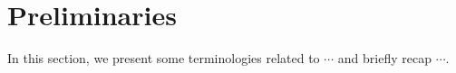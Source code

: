 \section{Preliminaries}\label{sec:preliminaries}

In this section,
we present some terminologies related to $\cdots$
and briefly recap $\cdots$.
